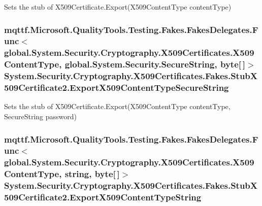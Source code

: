 Sets the stub of X509\-Certificate.\-Export(\-X509\-Content\-Type content\-Type)

\hypertarget{class_system_1_1_security_1_1_cryptography_1_1_x509_certificates_1_1_fakes_1_1_stub_x509_certificate2_add70f54891d548c3e1116a77a47fc9f4}{
\subsubsection[{Export\-X509\-Content\-Type\-Secure\-String}]{\setlength{\rightskip}{0pt plus 5cm}mqttf.\-Microsoft.\-Quality\-Tools.\-Testing.\-Fakes.\-Fakes\-Delegates.\-Func$<$global.\-System.\-Security.\-Cryptography.\-X509\-Certificates.\-X509\-Content\-Type, global.\-System.\-Security.\-Secure\-String, byte\mbox{[}$\,$\mbox{]}$>$ System.\-Security.\-Cryptography.\-X509\-Certificates.\-Fakes.\-Stub\-X509\-Certificate2.\-Export\-X509\-Content\-Type\-Secure\-String}}\label{class_system_1_1_security_1_1_cryptography_1_1_x509_certificates_1_1_fakes_1_1_stub_x509_certificate2_add70f54891d548c3e1116a77a47fc9f4}


Sets the stub of X509\-Certificate.\-Export(\-X509\-Content\-Type content\-Type, Secure\-String password)

\hypertarget{class_system_1_1_security_1_1_cryptography_1_1_x509_certificates_1_1_fakes_1_1_stub_x509_certificate2_ac0da1258789c516c73ace248ea2f63eb}{
\subsubsection[{Export\-X509\-Content\-Type\-String}]{\setlength{\rightskip}{0pt plus 5cm}mqttf.\-Microsoft.\-Quality\-Tools.\-Testing.\-Fakes.\-Fakes\-Delegates.\-Func$<$global.\-System.\-Security.\-Cryptography.\-X509\-Certificates.\-X509\-Content\-Type, string, byte\mbox{[}$\,$\mbox{]}$>$ System.\-Security.\-Cryptography.\-X509\-Certificates.\-Fakes.\-Stub\-X509\-Certificate2.\-Export\-X509\-Content\-Type\-String}}\label{class_system_1_1_security_1_1_cryptography_1_1_x509_certificates_1_1_fakes_1_1_stub_x509_certificate2_ac0da1258789c516c73ace248ea2f63eb}


